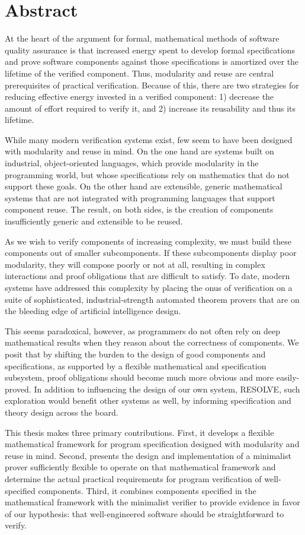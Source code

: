 \chapter*{Abstract}
At the heart of the argument for formal, mathematical methods of software quality assurance is that increased energy spent to develop formal specifications and prove software components against those specifications is amortized over the lifetime of the verified component.  Thus, modularity and reuse are central prerequisites of practical verification.  Because of this, there are two strategies for reducing effective energy invested in a verified component: 1) decrease the amount of effort required to verify it, and 2) increase its reusability and thus its lifetime.

While many modern verification systems exist, few seem to have been designed with modularity and reuse in mind.  On the one hand are systems built on industrial, object-oriented languages, which provide modularity in the programming world, but whose specifications rely on mathematics that do not support these goals.  On the other hand are extensible, generic mathematical systems that are not integrated with programming languages that support component reuse.  The result, on both sides, is the creation of components insufficiently generic and extensible to be reused.

As we wish to verify components of increasing complexity, we must build these components out of smaller subcomponents.  If these subcomponents display poor modularity, they will compose poorly or not at all, resulting in complex interactions and proof obligations that are difficult to satisfy.  To date, modern systems have addressed this complexity by placing the onus of verification on a suite of sophisticated, industrial-strength automated theorem provers that are on the bleeding edge of artificial intelligence design.

This seems paradoxical, however, as programmers do not often rely on deep mathematical results when they reason about the correctness of components.  We posit that by shifting the burden to the design of good components and specifications, as supported by a flexible mathematical and specification subsystem, proof obligations should become much more obvious and more easily-proved.  In addition to influencing the design of our own system, RESOLVE, such exploration would benefit other systems as well, by informing specification and theory design across the board.

This thesis makes three primary contributions.  First, it develops a flexible mathematical framework for program specification designed with modularity and reuse in mind.  Second, presents the design and implementation of a minimalist prover sufficiently flexible to operate on that mathematical framework and determine the actual practical requirements for program verification of well-specified components.  Third, it combines components specified in the mathematical framework with the minimalist verifier to provide evidence in favor of our hypothesis: that well-engineered software should be straightforward to verify.
